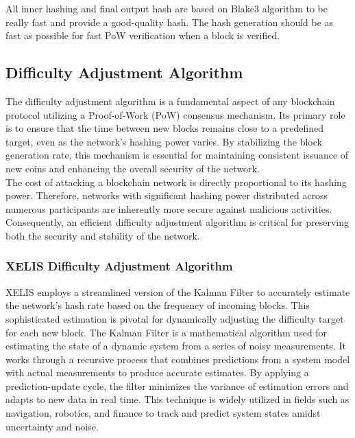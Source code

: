 \documentclass[10pt,a4paper,twocolumn]{article}
\begin{document}
All inner hashing and final output hash are based on Blake3 algorithm to be really fast and provide a good-quality hash. The hash generation should be as fast as possible for fast PoW verification when a block is verified.\\

\subsection{Difficulty Adjustment Algorithm}

The difficulty adjustment algorithm is a fundamental aspect of any blockchain protocol utilizing a Proof-of-Work (PoW) consensus mechanism. Its primary role is to ensure that the time between new blocks remains close to a predefined target, even as the network’s hashing power varies. By stabilizing the block generation rate, this mechanism is essential for maintaining consistent issuance of new coins and enhancing the overall security of the network.\\

The cost of attacking a blockchain network is directly proportional to its hashing power. Therefore, networks with significant hashing power distributed across numerous participants are inherently more secure against malicious activities. Consequently, an efficient difficulty adjustment algorithm is critical for preserving both the security and stability of the network.\\

\subsubsection{XELIS Difficulty Adjustment Algorithm}

XELIS employs a streamlined version of the Kalman Filter to accurately estimate the network’s hash rate based on the frequency of incoming blocks. This sophisticated estimation is pivotal for dynamically adjusting the difficulty target for each new block. The Kalman Filter is a mathematical algorithm used for estimating the state of a dynamic system from a series of noisy measurements. It works through a recursive process that combines predictions from a system model with actual measurements to produce accurate estimates. By applying a prediction-update cycle, the filter minimizes the variance of estimation errors and adapts to new data in real time. This technique is widely utilized in fields such as navigation, robotics, and finance to track and predict system states amidst uncertainty and noise.\\
\end{document}
